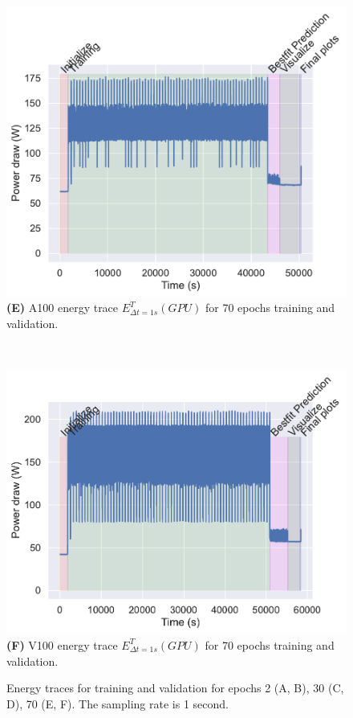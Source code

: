 \documentclass[utf8]{FrontiersinVancouver} %
\begin{document}
\begin{figure}[htb]
\begin{center}
     \begin{minipage}[b]{0.43\textwidth}
       \includegraphics[width=1.0\linewidth]{images/a100-shaded-energy-70-epochs}
        {\bf (E)} A100 energy trace $E^T_{\Delta t=1s}(GPU)$ for 70 epochs training and validation.
     \end{minipage}
     \ \
     \begin{minipage}[b]{0.43\textwidth}
        \includegraphics[width=1.0\linewidth]{images/v100-shaded-energy-70-epochs}
        {\bf (F)}  V100 energy trace $E^T_{\Delta t=1s}(GPU)$ for 70 epochs training and validation.
     \end{minipage}
\end{center}

     \caption{Energy traces for training and validation for epochs 2 (A, B), 30 (C, D), 70 (E, F). The sampling rate is 1 second.}
     \label{fig:energy-graphs}
\end{figure}
\end{document}
